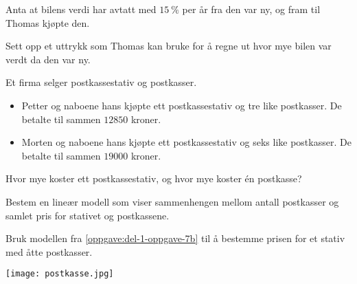 Anta at bilens verdi har avtatt med $\SI{15}{\percent}$ per år fra den var ny,
og fram til Thomas kjøpte den.

\begin{oppgaver}
   Sett opp et uttrykk som Thomas kan bruke for å regne ut hvor mye
    bilen var verdt da den var ny.
\end{oppgaver}


\Oppgave[4]

Et firma selger postkassestativ og postkasser.

\begin{itemize}
  \item Petter og naboene hans kjøpte ett postkassestativ og tre like
    postkasser. De betalte til sammen $\num{12850}$ kroner.
  \item Morten og naboene hans kjøpte ett postkassestativ og seks like
    postkasser. De betalte til sammen $\num{19000}$ kroner.
\end{itemize}

\begin{oppgaver}
   Hvor mye koster ett postkassestativ, og hvor mye koster én
    postkasse?
\end{oppgaver}

\begin{oppgaver}
   Bestem en lineær modell som viser sammenhengen mellom antall
    postkasser og samlet pris for stativet og postkassene.
    \label{oppgave:del-1-oppgave-7b}
\end{oppgaver}

\begin{oppgaver}
   Bruk modellen fra \cref{oppgave:del-1-oppgave-7b} til å bestemme
    prisen for et stativ med åtte postkasser.
\end{oppgaver}

\begin{center}
  \texttt{[image: postkasse.jpg]}
\end{center}


\Oppgave[2] 

